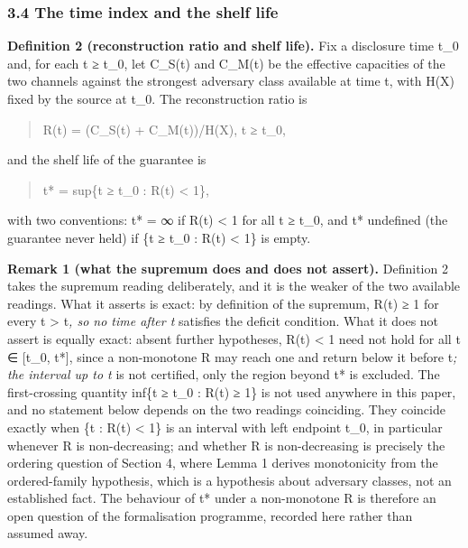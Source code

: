 \documentclass[
]{llncs}
\begin{document}
\subsubsection{3.4 The time index and the shelf
life}\label{the-time-index-and-the-shelf-life}

\textbf{Definition 2 (reconstruction ratio and shelf life).} Fix a
disclosure time t\_0 and, for each t ≥ t\_0, let C\_S(t) and C\_M(t) be
the effective capacities of the two channels against the strongest
adversary class available at time t, with H(X) fixed by the source at
t\_0. The reconstruction ratio is

\begin{quote}
R(t) = (C\_S(t) + C\_M(t))/H(X), t ≥ t\_0,
\end{quote}

and the shelf life of the guarantee is

\begin{quote}
t* = sup\{t ≥ t\_0 : R(t) \textless{} 1\},
\end{quote}

with two conventions: t* = ∞ if R(t) \textless{} 1 for all t ≥ t\_0, and
t* undefined (the guarantee never held) if \{t ≥ t\_0 : R(t) \textless{}
1\} is empty.

\textbf{Remark 1 (what the supremum does and does not assert).}
Definition 2 takes the supremum reading deliberately, and it is the
weaker of the two available readings. What it asserts is exact: by
definition of the supremum, R(t) ≥ 1 for every t \textgreater{} t\emph{,
so no time after t} satisfies the deficit condition. What it does not
assert is equally exact: absent further hypotheses, R(t) \textless{} 1
need not hold for all t ∈ {[}t\_0, t*{]}, since a non-monotone R may
reach one and return below it before t\emph{; the interval up to t} is
not certified, only the region beyond t* is excluded. The first-crossing
quantity inf\{t ≥ t\_0 : R(t) ≥ 1\} is not used anywhere in this paper,
and no statement below depends on the two readings coinciding. They
coincide exactly when \{t : R(t) \textless{} 1\} is an interval with
left endpoint t\_0, in particular whenever R is non-decreasing; and
whether R is non-decreasing is precisely the ordering question of
Section 4, where Lemma 1 derives monotonicity from the ordered-family
hypothesis, which is a hypothesis about adversary classes, not an
established fact. The behaviour of t* under a non-monotone R is
therefore an open question of the formalisation programme, recorded here
rather than assumed away.
\end{document}
